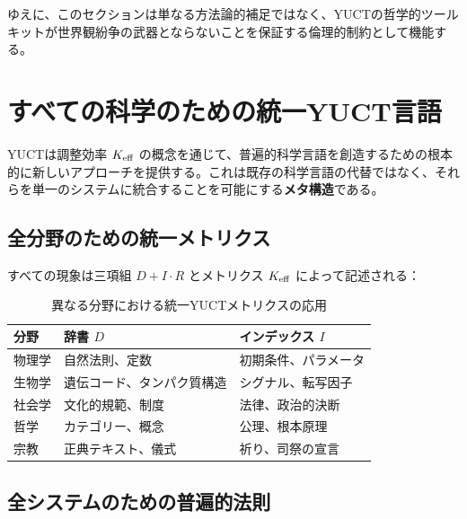 \documentclass[11pt,a4paper]{article}
\begin{document}
	ゆえに、このセクションは単なる方法論的補足ではなく、YUCTの哲学的ツールキットが世界観紛争の武器とならないことを保証する倫理的制約として機能する。
	
	
	\section{すべての科学のための統一YUCT言語}
	
	YUCTは調整効率 \(\Keff\) の概念を通じて、普遍的科学言語を創造するための根本的に新しいアプローチを提供する。これは既存の科学言語の代替ではなく、それらを単一のシステムに統合することを可能にする\textbf{メタ構造}である。
	
	\subsection{全分野のための統一メトリクス}
	
	すべての現象は三項組 \(D + I \cdot R\) とメトリクス \(\Keff\) によって記述される：
	
	\begin{table}[H]
		\centering
		\caption{異なる分野における統一YUCTメトリクスの応用}
		\label{tab:unified-metrics}
		\begin{tabular}{p{3.5cm}p{4.5cm}p{4.5cm}}
			\toprule
			\textbf{分野} & \textbf{辞書 \(D\)} & \textbf{インデックス \(I\)} \\
			\midrule
			物理学 & 自然法則、定数 & 初期条件、パラメータ \\
			生物学 & 遺伝コード、タンパク質構造 & シグナル、転写因子 \\
			社会学 & 文化的規範、制度 & 法律、政治的決断 \\
			哲学 & カテゴリー、概念 & 公理、根本原理 \\
			宗教 & 正典テキスト、儀式 & 祈り、司祭の宣言 \\
			\bottomrule
		\end{tabular}
	\end{table}
	
	\subsection{全システムのための普遍的法則}
	
\end{document}
